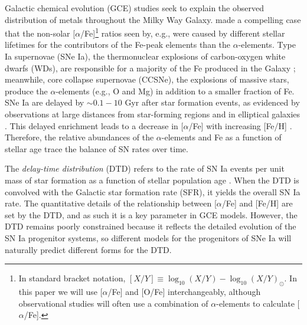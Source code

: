 \documentclass[twocolumn,twocolappendix,linenumbers]{aastex631}
\newcommand{\aFe}{[$\alpha$/Fe]\xspace}
\begin{document}
Galactic chemical evolution (GCE) studies seek to explain the observed distribution of metals throughout the Milky Way Galaxy. \citet{Tinsley1979-StellarLifetimes} made a compelling case that the non-solar \aFe\footnote{
    In standard bracket notation, $[X/Y]\equiv \log_{10}(X/Y) - \log_{10}(X/Y)_{\odot}$. In this paper we will use \aFe and [O/Fe] interchangeably, although observational studies will often use a combination of $\alpha$-elements to calculate \aFe.
} ratios seen by, e.g., \citet{Wallerstein1962-GDwarfAbundances} were caused by different stellar lifetimes for the contributors of the Fe-peak elements than the $\alpha$-elements. Type Ia supernovae (SNe Ia), the thermonuclear explosions of carbon-oxygen white dwarfs (WDs), are responsible for a majority of the Fe produced in the Galaxy \citep{Matteucci1986-SupernovaEnrichment}; meanwhile, core collapse supernovae (CCSNe), the explosions of massive stars, produce the $\alpha$-elements (e.g., O and Mg) in addition to a smaller fraction of Fe. SNe Ia are delayed by $\sim0.1-10$ Gyr after star formation events, as evidenced by observations at large distances from star-forming regions and in elliptical galaxies \citep[e.g.,][]{Maza1976-SNStatistics}. This delayed enrichment leads to a decrease in \aFe with increasing [Fe/H] \citep{Matteucci1986-SupernovaEnrichment}. Therefore, the relative abundances of the $\alpha$-elements and Fe as a function of stellar age trace the balance of SN rates over time.

The {\it delay-time distribution} (DTD) refers to the rate of SN Ia events per unit mass of star formation as a function of stellar population age \citep[for a review, see Section 3.5 of][]{Maoz2014-Review}. When the DTD is convolved with the Galactic star formation rate (SFR), it yields the overall SN Ia rate. The quantitative details of the relationship between \aFe and [Fe/H] are set by the DTD, and as such it is a key parameter in GCE models. However, the DTD remains poorly constrained because it reflects the detailed evolution of the SN Ia progenitor systems, so different models for the progenitors of SNe Ia will naturally predict different forms for the DTD.
\end{document}
